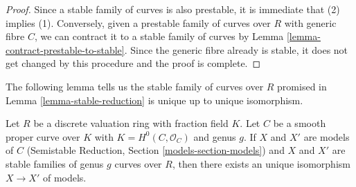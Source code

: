 \begin{proof}
Since a stable family of curves is also prestable, it is immediate that
(2) implies (1). Conversely, given a prestable family of curves over $R$
with generic fibre $C$, we can contract it to a stable family of curves
by Lemma \ref{lemma-contract-prestable-to-stable}. Since the generic
fibre already is stable, it does not get changed by this procedure and
the proof is complete.
\end{proof}

\noindent
The following lemma tells us the stable family of curves over $R$
promised in Lemma \ref{lemma-stable-reduction}
is unique up to unique isomorphism.

\begin{lemma}
\label{lemma-unique-stable-model}
Let $R$ be a discrete valuation ring with fraction field $K$.
Let $C$ be a smooth proper curve over $K$
with $K = H^0(C, \mathcal{O}_C)$ and genus $g$.
If $X$ and $X'$ are models of $C$
(Semistable Reduction, Section \ref{models-section-models})
and $X$ and $X'$ are stable families of genus $g$ curves over $R$,
then there exists an unique isomorphism $X \to X'$ of models.
\end{lemma}

